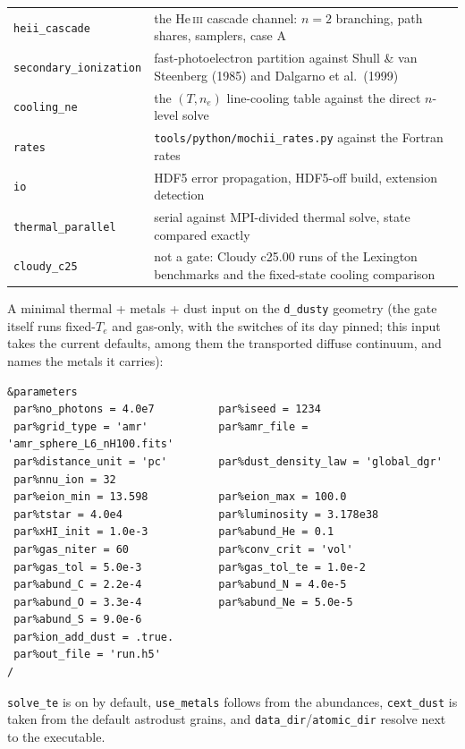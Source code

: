 \documentclass[english,a4paper]{my_memo}
\newcommand{\code}[1]{\texttt{#1}}
\begin{document}
{\begin{longtable}{lp{10.2cm}}
\code{heii\_cascade} & the He\,\textsc{iii} cascade channel: $n=2$ branching, path shares, samplers, case A \\
\code{secondary\_ionization} & fast-photoelectron partition against Shull \& van Steenberg (1985) and Dalgarno et al.\ (1999) \\
\code{cooling\_ne} & the $(T, n_e)$ line-cooling table against the direct $n$-level solve \\
\code{rates} & \code{tools/python/mochii\_rates.py} against the Fortran rates \\
\code{io} & HDF5 error propagation, HDF5-off build, extension detection \\
\code{thermal\_parallel} & serial against MPI-divided thermal solve, state compared exactly \\
\code{cloudy\_c25} & not a gate: Cloudy c25.00 runs of the Lexington benchmarks and the fixed-state cooling comparison \\
\end{longtable}
}
A minimal thermal + metals + dust input on the \code{d\_dusty} geometry (the
gate itself runs fixed-$T_e$ and gas-only, with the switches of its day
pinned; this input takes the current defaults, among them the transported
diffuse continuum, and names the metals it carries):
\begin{verbatim}
&parameters
 par%no_photons = 4.0e7          par%iseed = 1234
 par%grid_type = 'amr'           par%amr_file = 'amr_sphere_L6_nH100.fits'
 par%distance_unit = 'pc'        par%dust_density_law = 'global_dgr'
 par%nnu_ion = 32
 par%eion_min = 13.598           par%eion_max = 100.0
 par%tstar = 4.0e4               par%luminosity = 3.178e38
 par%xHI_init = 1.0e-3           par%abund_He = 0.1
 par%gas_niter = 60              par%conv_crit = 'vol'
 par%gas_tol = 5.0e-3            par%gas_tol_te = 1.0e-2
 par%abund_C = 2.2e-4            par%abund_N = 4.0e-5
 par%abund_O = 3.3e-4            par%abund_Ne = 5.0e-5
 par%abund_S = 9.0e-6
 par%ion_add_dust = .true.
 par%out_file = 'run.h5'
/
\end{verbatim}
\code{solve\_te} is on by default, \code{use\_metals} follows from the
abundances, \code{cext\_dust} is taken from the default astrodust grains, and
\code{data\_dir}/\code{atomic\_dir} resolve next to the executable.

\end{document}
